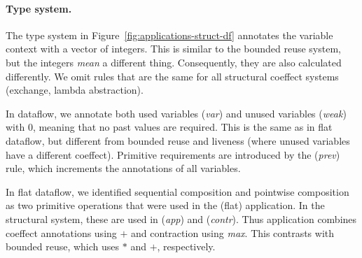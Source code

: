 \paragraph{Type system.}
The type system in Figure~\ref{fig:applications-struct-df} annotates the variable context with a
vector of integers. This is similar to the bounded reuse system, but the integers \emph{mean} a
different thing. Consequently, they are also calculated differently. We omit rules that are the
same for all structural coeffect systems (exchange, lambda abstraction).

In dataflow, we annotate both used variables (\emph{var}) and unused variables (\emph{weak}) with
$0$, meaning that no past values are required. This is the same as in flat dataflow, but different
from bounded reuse and liveness (where unused variables have a different coeffect). Primitive
requirements are introduced by the (\emph{prev}) rule, which increments the annotations of
all variables.

In flat dataflow, we identified sequential composition and pointwise composition as two primitive
operations that were used in the (flat) application. In the structural system, these are used in
(\emph{app}) and (\emph{contr}). Thus application combines coeffect annotations using $+$ and
contraction using \emph{max}. This contrasts with bounded reuse, which uses $\ast$ and $+$,
respectively.

